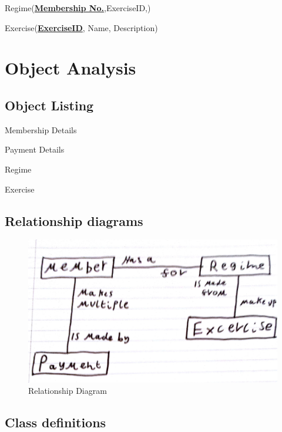 Regime(\textbf{\underline{Membership No.}},ExerciseID,)

Exercise(\textbf{\underline{ExerciseID}}, Name, Description)

\section{Object Analysis}

\subsection{Object Listing}

Membership Details

Payment Details

Regime

Exercise

\subsection{Relationship diagrams}

\begin{figure}[H]
    \includegraphics[width=\textwidth]{RelationshipDiagram.jpg}
    \caption{Relationship Diagram} \label{fig: Relationship Diagram}
\end{figure}

\subsection{Class definitions}


